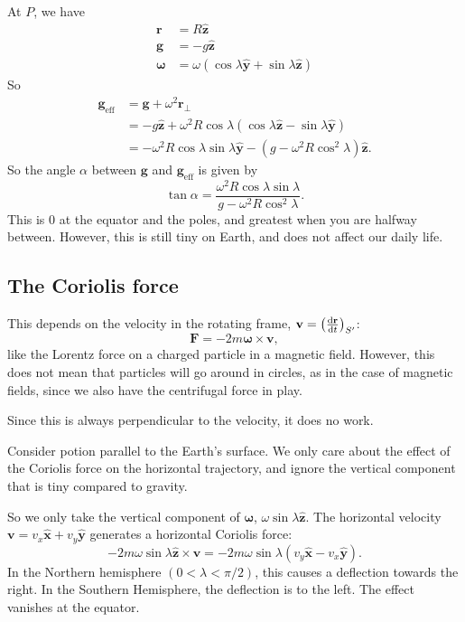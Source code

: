 \documentclass[a4paper]{article}
\begin{document}
At $P$, we have
\begin{align*}
  \mathbf{r} &= R\hat{\mathbf{z}}\\
  \mathbf{g} &= -g\hat{\mathbf{z}}\\
  \boldsymbol\omega &= \omega(\cos\lambda \hat{\mathbf{y}} + \sin \lambda \hat{\mathbf{z}})
\end{align*}
So
\begin{align*}
  \mathbf{g}_{\mathrm{eff}} &= \mathbf{g} + \omega^2 \mathbf{r}_\bot \\
  &= -g\hat{\mathbf{z}} + \omega^2 R\cos\lambda(\cos\lambda\hat{\mathbf{z}} - \sin\lambda\hat{\mathbf{y}})\\
  &= -\omega^2 R\cos\lambda\sin\lambda\hat{\mathbf{y}} - (g - \omega^2 R\cos^2\lambda)\hat{\mathbf{z}}.
\end{align*}
So the angle $\alpha$ between $\mathbf{g}$ and $\mathbf{g}_{\text{eff}}$ is given by
\[
  \tan \alpha = \frac{\omega^2 R\cos\lambda\sin\lambda}{g - \omega^2R\cos^2\lambda}.
\]
This is 0 at the equator and the poles, and greatest when you are halfway between. However, this is still tiny on Earth, and does not affect our daily life.

\subsection{The Coriolis force}
This depends on the velocity in the rotating frame, $\mathbf{v} = \left(\frac{\mathrm{d} \mathbf{r}}{\mathrm{d} t}\right)_{S'}$:
\[
  \mathbf{F} = -2m\boldsymbol\omega\times \mathbf{v},
\]
like the Lorentz force on a charged particle in a magnetic field. However, this does not mean that particles will go around in circles, as in the case of magnetic fields, since we also have the centrifugal force in play.

Since this is always perpendicular to the velocity, it does no work.

Consider potion parallel to the Earth's surface. We only care about the effect of the Coriolis force on the horizontal trajectory, and ignore the vertical component that is tiny compared to gravity.

So we only take the vertical component of $\boldsymbol\omega$, $\omega\sin\lambda\hat{\mathbf{z}}$. The horizontal velocity $\mathbf{v} = v_x \hat{\mathbf{x}} + v_y \hat{\mathbf{y}}$ generates a horizontal Coriolis force:
\[
  -2m\omega\sin\lambda\hat{\mathbf{z}}\times \mathbf{v} = -2m\omega\sin\lambda(v_y \hat{\mathbf{x}} - v_x \hat{\mathbf{y}}).
\]
In the Northern hemisphere $(0 < \lambda < \pi/2)$, this causes a deflection towards the right. In the Southern Hemisphere, the deflection is to the left. The effect vanishes at the equator.
\end{document}
